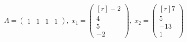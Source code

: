 $$
A = \begin{pmatrix}
  1 & 1 & 1 & 1
\end{pmatrix},\; x_1 = \begin{pmatrix*}[r]
  -2 \\
   4 \\
   5 \\
  -2
\end{pmatrix*},\; x_2 = \begin{pmatrix*}[r]
    7 \\
    5 \\
  -13 \\
    1
\end{pmatrix*}
$$

\begin{solution}
  \ \\
\end{solution}